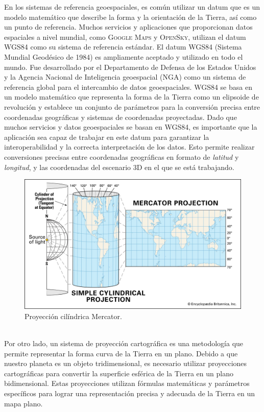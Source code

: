 \documentclass[a4paper, 11pt]{book}
\begin{document}
En los sistemas de referencia geoespaciales, es común utilizar un \gls{datum} que es un modelo matemático que describe la forma y la orientación de la Tierra, así como un punto de referencia. Muchos servicios y aplicaciones que proporcionan datos espaciales a nivel mundial, como \textsc{Google Maps} y \textsc{OpenSky}, utilizan el datum \textsc{WGS84} como su sistema de referencia estándar.
El datum \textsc{WGS84} (Sistema Mundial Geodésico de 1984) es ampliamente aceptado y utilizado en todo el mundo. Fue desarrollado por el Departamento de Defensa de los Estados Unidos y la Agencia Nacional de Inteligencia \gls{geoespacial} (\textsc{NGA}) como un sistema de referencia global para el intercambio de datos geoespaciales.
\textsc{WGS84} se basa en un modelo matemático que representa la forma de la Tierra como un elipsoide de revolución y establece un conjunto de parámetros para la conversión precisa entre coordenadas geográficas y sistemas de coordenadas proyectadas.
Dado que muchos servicios y datos geoespaciales se basan en \textsc{WGS84}, es importante que la aplicación sea capaz de trabajar en este datum para garantizar la interoperabilidad y la correcta interpretación de los datos. Esto permite realizar conversiones precisas entre coordenadas geográficas en formato de \emph{latitud} y \emph{longitud}, y las coordenadas del escenario \textsc{3D} en el que se está trabajando.
\begin{figure}[h]
	\centering
	\includegraphics[width=12cm, keepaspectratio]{img/simple-cylindrical-projection-earth-map-globe-mercator.jpg}
	\caption{Proyección cilíndrica Mercator.}
	\label{fig:mercator}
\end{figure}
\\Por otro lado, un sistema de proyección cartográfica es una metodología que permite representar la forma curva de la Tierra en un plano. Debido a que nuestro planeta es un objeto tridimensional, es necesario utilizar proyecciones cartográficas para convertir la superficie esférica de la Tierra en un plano bidimensional. Estas proyecciones utilizan fórmulas matemáticas y parámetros específicos para lograr una representación precisa y adecuada de la Tierra en un mapa plano.
\end{document}
